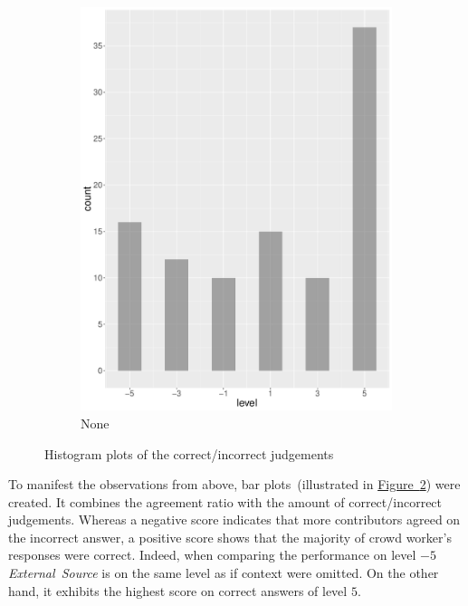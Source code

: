 \begin{figure}
\begin{subfigure}[b]{0.4\textwidth}
        \includegraphics[width=\textwidth]{plots/climate_change/hist_level_none}
        \caption{None}
        \label{fig:hist_level_climate_change_none}
    \end{subfigure}
    \caption{Histogram plots of the correct/incorrect judgements}\label{fig:hist_level_climate_change_all}
\end{figure}

To manifest the observations from above, bar plots~(illustrated in \hyperref[fig:hist_level_climate_change_all]{Figure~\ref*{fig:hist_level_climate_change_all}}) were created. It combines the agreement ratio with the amount of correct/incorrect judgements. Whereas a negative score indicates that more contributors agreed on the incorrect answer, a positive score shows that the majority of crowd worker's responses were correct. Indeed, when comparing the performance on level $-5$ \emph{External~Source} is on the same level as if context were omitted. On the other hand, it exhibits the highest score on correct answers of level $5$.

